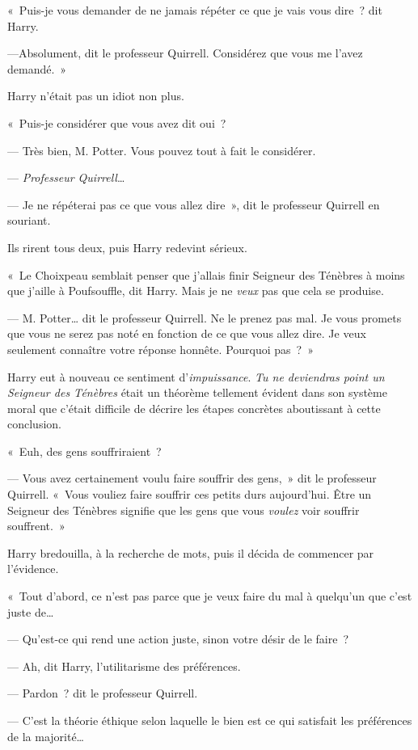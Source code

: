 «~Puis-je vous demander de ne jamais répéter ce que je vais vous dire~? dit Harry.

---Absolument, dit le professeur Quirrell.
Considérez que vous me l'avez demandé.~»

Harry n'était pas un idiot non plus.

«~Puis-je considérer que vous avez dit oui~?

--- Très bien, M. Potter.
Vous pouvez tout à fait le considérer.

--- \emph{Professeur Quirrell}…

--- Je ne répéterai pas ce que vous allez dire~», dit le professeur Quirrell en souriant.

Ils rirent tous deux, puis Harry redevint sérieux.

«~Le Choixpeau semblait penser que j'allais finir Seigneur des Ténèbres à moins que j'aille à Poufsouffle, dit Harry.
Mais je ne \emph{veux} pas que cela se produise.

--- M. Potter… dit le professeur Quirrell.
Ne le prenez pas mal.
Je vous promets que vous ne serez pas noté en fonction de ce que vous allez dire.
Je veux seulement connaître votre réponse honnête.
Pourquoi pas~?~»

Harry eut à nouveau ce sentiment d'\emph{impuissance}.
\emph{Tu ne deviendras point un Seigneur des Ténèbres} était un théorème tellement évident dans son système moral que c'était difficile de décrire les étapes concrètes aboutissant à cette conclusion.

«~Euh, des gens souffriraient~?

--- Vous avez certainement voulu faire souffrir des gens,~» dit le professeur Quirrell.
«~Vous vouliez faire souffrir ces petits durs aujourd'hui.
Être un Seigneur des Ténèbres signifie que les gens que vous \emph{voulez} voir souffrir souffrent.~»

Harry bredouilla, à la recherche de mots, puis il décida de commencer par l'évidence.

«~Tout d'abord, ce n'est pas parce que je veux faire du mal à quelqu'un que c'est juste de…

--- Qu'est-ce qui rend une action juste, sinon votre désir de le faire~?

--- Ah, dit Harry, l'utilitarisme des préférences.

--- Pardon~? dit le professeur Quirrell.

--- C'est la théorie éthique selon laquelle le bien est ce qui satisfait les préférences de la majorité…

